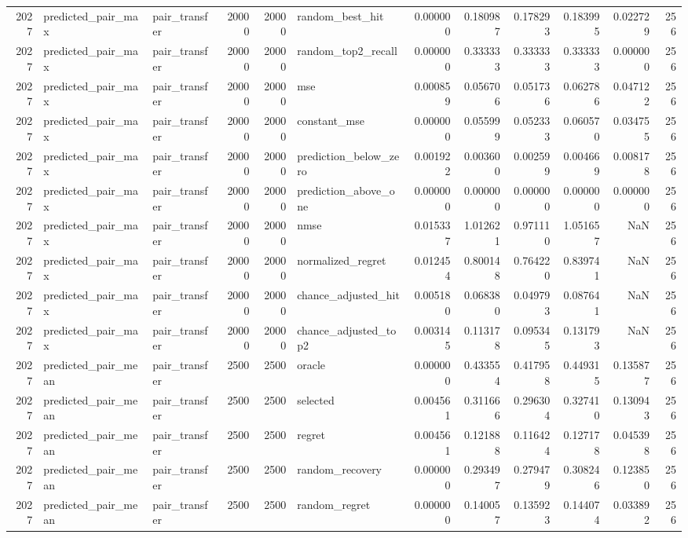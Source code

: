 \begin{tabular}{rllrrlrrrrrr}
2027 & predicted_pair_max & pair_transfer & 20000 & 20000 & random_best_hit & 0.000000 & 0.180987 & 0.178293 & 0.183995 & 0.022729 & 256 \\
2027 & predicted_pair_max & pair_transfer & 20000 & 20000 & random_top2_recall & 0.000000 & 0.333333 & 0.333333 & 0.333333 & 0.000000 & 256 \\
2027 & predicted_pair_max & pair_transfer & 20000 & 20000 & mse & 0.000859 & 0.056706 & 0.051736 & 0.062786 & 0.047122 & 256 \\
2027 & predicted_pair_max & pair_transfer & 20000 & 20000 & constant_mse & 0.000000 & 0.055999 & 0.052333 & 0.060570 & 0.034755 & 256 \\
2027 & predicted_pair_max & pair_transfer & 20000 & 20000 & prediction_below_zero & 0.001922 & 0.003600 & 0.002599 & 0.004669 & 0.008178 & 256 \\
2027 & predicted_pair_max & pair_transfer & 20000 & 20000 & prediction_above_one & 0.000000 & 0.000000 & 0.000000 & 0.000000 & 0.000000 & 256 \\
2027 & predicted_pair_max & pair_transfer & 20000 & 20000 & nmse & 0.015337 & 1.012621 & 0.971110 & 1.051657 & NaN & 256 \\
2027 & predicted_pair_max & pair_transfer & 20000 & 20000 & normalized_regret & 0.012454 & 0.800148 & 0.764220 & 0.839741 & NaN & 256 \\
2027 & predicted_pair_max & pair_transfer & 20000 & 20000 & chance_adjusted_hit & 0.005180 & 0.068380 & 0.049793 & 0.087641 & NaN & 256 \\
2027 & predicted_pair_max & pair_transfer & 20000 & 20000 & chance_adjusted_top2 & 0.003145 & 0.113178 & 0.095345 & 0.131793 & NaN & 256 \\
2027 & predicted_pair_mean & pair_transfer & 2500 & 2500 & oracle & 0.000000 & 0.433554 & 0.417958 & 0.449315 & 0.135877 & 256 \\
2027 & predicted_pair_mean & pair_transfer & 2500 & 2500 & selected & 0.004561 & 0.311666 & 0.296304 & 0.327410 & 0.130943 & 256 \\
2027 & predicted_pair_mean & pair_transfer & 2500 & 2500 & regret & 0.004561 & 0.121888 & 0.116424 & 0.127178 & 0.045398 & 256 \\
2027 & predicted_pair_mean & pair_transfer & 2500 & 2500 & random_recovery & 0.000000 & 0.293497 & 0.279479 & 0.308246 & 0.123850 & 256 \\
2027 & predicted_pair_mean & pair_transfer & 2500 & 2500 & random_regret & 0.000000 & 0.140057 & 0.135923 & 0.144074 & 0.033892 & 256 \\

\end{tabular}
